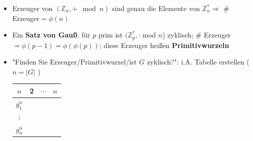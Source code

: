 \documentclass[10pt,a4paper]{article}
\begin{document}
\begin{itemize}
\item Erzeuger von $(\mathbb{Z}_{n},+ \mod n)$ sind genau die Elemente von $\mathbb{Z}_{n}^{*}\Rightarrow$ \# Erzeuger$=\phi(n)$ 
\item Ein \textbf{Satz von Gauß}: für $p$ prim ist $(\mathbb{Z}_{p}^{*}, \cdot \text{ mod } n$) zyklisch; \# Erzeuger$=\phi(p-1)=\phi(\phi(p))$; diese Erzeuger heißen \textbf{Primitivwurzeln}
\item "Finden Sie Erzeuger/Primitivwurzel/ist $G$ zyklisch?": i.A. Tabelle erstellen ($n=\vert G\vert$ )
\begin{tabular}{c|c c c}
$n$ & 2&$\cdots$ &$n$\\
\hline
$g_{1}^{n}$&&&\\
$\vdots$ &&&\\
$g_{n}^{n}$&&&
\end{tabular}


\end{itemize}
\end{document}
